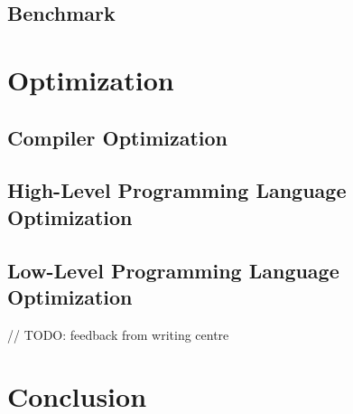 \documentclass[sigconf, review=false]{acmart}
\begin{document}
\subsection{Benchmark}


\section{Optimization}
\subsection{Compiler Optimization}

\subsection{High-Level Programming Language Optimization}

\subsection{Low-Level Programming Language Optimization}





// TODO: feedback from writing centre

\section{Conclusion}





\end{document}
